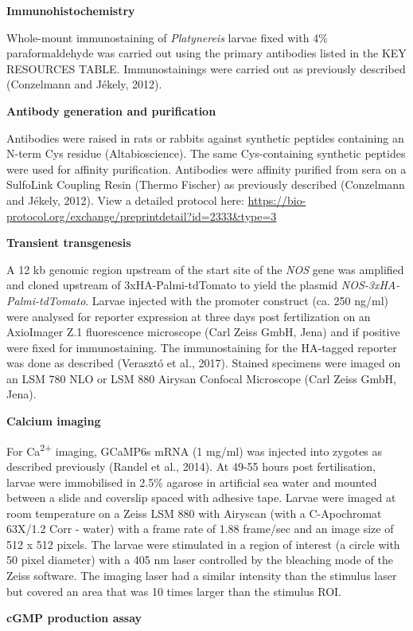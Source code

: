 \documentclass[
  10pt,
  onecolumn]{article}
\begin{document}
\textbf{Immunohistochemistry}

Whole-mount immunostaining of \emph{Platynereis} larvae fixed with 4\%
paraformaldehyde was carried out using the primary antibodies listed in
the KEY RESOURCES TABLE. Immunostainings were carried out as previously
described (Conzelmann and Jékely, 2012).

\textbf{Antibody generation and purification}

Antibodies were raised in rats or rabbits against synthetic peptides
containing an N-term Cys residue (Altabioscience). The same
Cys-containing synthetic peptides were used for affinity purification.
Antibodies were affinity purified from sera on a SulfoLink Coupling
Resin (Thermo Fischer) as previously described (Conzelmann and Jékely,
2012). View a detailed protocol here:
\url{https://bio-protocol.org/exchange/preprintdetail?id=2333\&type=3}

\textbf{Transient transgenesis}

A 12 kb genomic region upstream of the start site of the \emph{NOS} gene
was amplified and cloned upstream of 3xHA-Palmi-tdTomato to yield the
plasmid \emph{NOS-3xHA-Palmi-tdTomato}. Larvae injected with the
promoter construct (ca. 250 ng/ml) were analysed for reporter expression
at three days post fertilization on an AxioImager Z.1 fluorescence
microscope (Carl Zeiss GmbH, Jena) and if positive were fixed for
immunostaining. The immunostaining for the HA-tagged reporter was done
as described (Verasztó et al., 2017). Stained specimens were imaged on
an LSM 780 NLO or LSM 880 Airysan Confocal Microscope (Carl Zeiss GmbH,
Jena).

\textbf{Calcium imaging}

For Ca\textsuperscript{2+} imaging, GCaMP6s mRNA (1 mg/ml) was injected
into zygotes as described previously (Randel et al., 2014). At 49-55
hours post fertilisation, larvae were immobilised in 2.5\% agarose in
artificial sea water and mounted between a slide and coverslip spaced
with adhesive tape. Larvae were imaged at room temperature on a Zeiss
LSM 880 with Airyscan (with a C-Apochromat 63X/1.2 Corr - water) with a
frame rate of 1.88 frame/sec and an image size of 512 x 512 pixels. The
larvae were stimulated in a region of interest (a circle with 50 pixel
diameter) with a 405 nm laser controlled by the bleaching mode of the
Zeiss software. The imaging laser had a similar intensity than the
stimulus laser but covered an area that was 10 times larger than the
stimulus ROI.

\textbf{cGMP production assay}
\end{document}
